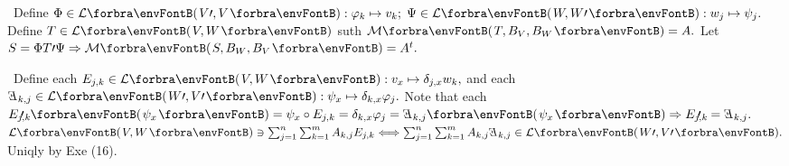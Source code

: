 \par
{}\BulletPointX{}\,\,\,Define $\Phi\in\Lm{V\apostrophe,V}:\varphi_k\mapsto v_k;\;\Psi\in\Lm{W,W\apostrophe}:w_j\mapsto\psi_j.$\TextB{}
Define $T\in\Lm{V,W}$ suth $\Mt{T,B_V,B_W}=A.$ Let $S=\Phi T\apostrophe\Psi\Rightarrow\Mt{S,B_W,B_V}=A^t.$\vspace{2pt}\par
{}\BulletPointX{}\,\,\,Define each $E_{j,k}\in\Lm{V,W}:v_x\mapsto\delta_{j,x}w_k,$ and each $\reflectbox{\textit{E}}{_{k,j}}\in\Lm{W\apostrophe,V\apostrophe}:\psi_x\mapsto\delta_{k,x}\varphi_j.$\TextB{}
Note that each $E_{j,k}\!\!\upapostrophe\,\,\Par{\psi_x}=\psi_x\circ E_{j,k}=\delta_{k,x}\varphi_j=\reflectbox{\textit{E}}{_{k,j}}\Par{\psi_x}\Rightarrow E_{j,k}\!\!\upapostrophe\,\,=\reflectbox{\textit{E}}{_{k,j}}.$\vspace{1pt}\TextB{}
$\Lm{V,W}\ni \sum_{j=1}^n\sum_{k=1}^mA_{k,j}E_{j,k}\Longleftrightarrow\sum_{j=1}^n\sum_{k=1}^mA_{k,j}\reflectbox{\textit{E}}{_{k,j}}\in\Lm{W\apostrophe,V\apostrophe}.$ Uniqly by Exe (16).%
\SepLine


